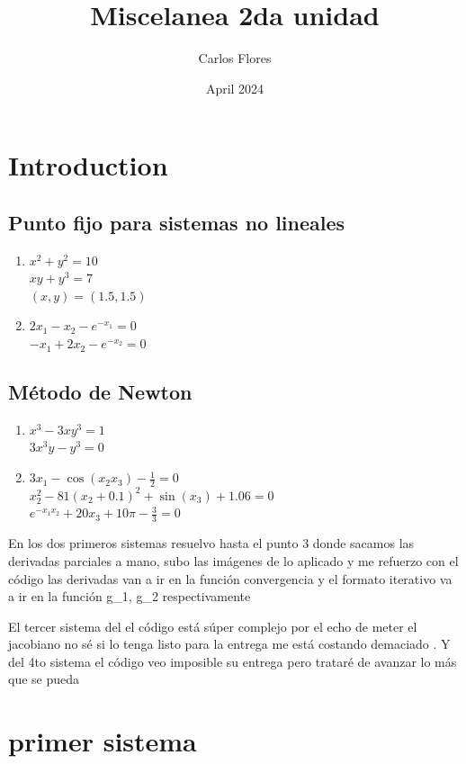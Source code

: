 \documentclass{article}
\title{Miscelanea 2da unidad}
\author{Carlos Flores}
\date{April 2024}
\begin{document}
\maketitle

\section{Introduction}

\subsection*{Punto fijo para sistemas no lineales }
\begin{enumerate}
    \item $x^2 + y^2 = 10$ \\
    $xy + y^3 = 7$ \\
    $(x, y) = (1.5, 1.5)$       
    
    \item $2x_1 - x_2 - e^{-x_1} = 0$ \\
    $-x_1 + 2x_2 - e^{-x_2} = 0$
\end{enumerate}

\subsection*{Método de Newton }
\begin{enumerate}
    \item $x^3 - 3xy^3 = 1$ \\
    $3x^3y - y^3 = 0$
    
    \item $3x_1 - \cos(x_2x_3) - \frac{1}{2} = 0$ \\
    $x_2^2 - 81(x_2 + 0.1)^2 + \sin(x_3) + 1.06 = 0$ \\
    $e^{-x_1x_2} + 20x_3 + 10\pi - \frac{3}{3} = 0$
\end{enumerate}


{En  los dos primeros sistemas resuelvo hasta el punto 3 donde sacamos las derivadas parciales a mano, subo las imágenes de lo aplicado y me refuerzo con el código
las derivadas van a ir en la función convergencia y el formato iterativo va a ir en la función g_1, g_2 respectivamente

El tercer sistema del el código está súper complejo por el echo de meter el jacobiano no sé si lo tenga listo para la entrega me está costando demaciado . Y del 4to sistema el código veo imposible su entrega pero trataré de avanzar lo más que se pueda}
\section{primer sistema}
\end{document}

